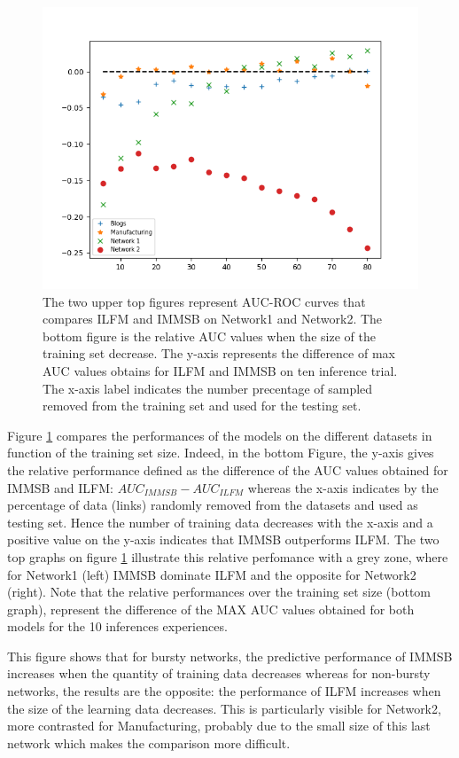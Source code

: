\begin{figure}[h]
\begin{minipage}{0.4\textwidth}
            \includegraphics[width=\textwidth]{img/corpus/testset_max_20.png}
        \end{minipage}
        \caption{The two upper top figures represent AUC-ROC curves that compares ILFM and IMMSB on Network1 and Network2. The bottom figure is the relative AUC values when the size of the training set decrease. The y-axis represents the difference of max AUC values obtains for ILFM and IMMSB on ten inference trial. The x-axis label indicates the number precentage of sampled removed from the training set and used for the testing set. } 
	\label{fig:auc}
\end{figure}


Figure \ref{fig:auc} compares the performances of the models on the different datasets in function of  the training set size. Indeed, in the bottom Figure, the y-axis gives the relative performance defined as the difference of the AUC values obtained for IMMSB and ILFM: $AUC_{IMMSB} - AUC_{ILFM}$ whereas the x-axis indicates by the percentage of data (links) randomly removed from the datasets and  used as  testing set. Hence the number of training data decreases with the x-axis and a positive value on the y-axis indicates that IMMSB outperforms ILFM. The two top graphs on figure \ref{fig:auc} illustrate this relative perfomance with a grey zone, where for Network1 (left) IMMSB dominate ILFM and the opposite for Network2 (right). Note that the relative performances over the training set size (bottom graph), represent the difference of the MAX AUC values obtained for both models for the 10 inferences experiences.


This figure shows that for bursty networks, the predictive performance of IMMSB increases when the quantity of training data decreases whereas for non-bursty networks, the results are the opposite: the performance of ILFM increases when the size of the learning data decreases. This is particularly visible for Network2, more contrasted for Manufacturing,  probably due to the small size of this last network which makes the comparison more difficult.




